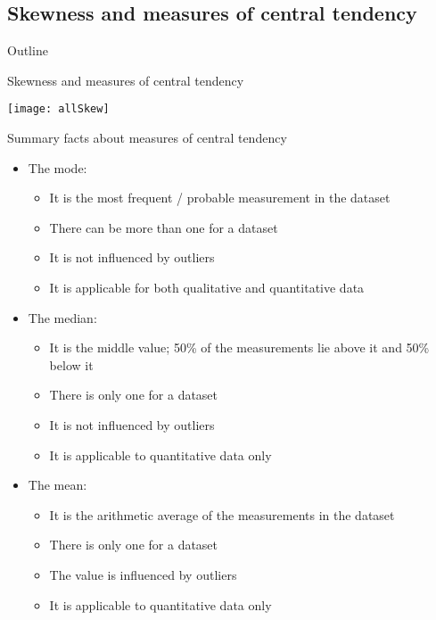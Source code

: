 \documentclass[xcolor=dvipsnames]{beamer}
\begin{document}
\subsection{Skewness and measures of central tendency}
\begin{frame}{Outline}
\tableofcontents[currentsection,subsectionstyle=show/shaded/hide]
\end{frame}

\begin{frame}{Skewness and measures of central tendency}
	\begin{center}
		\texttt{[image: allSkew]}
	\end{center}
\end{frame}

\begin{frame}{Summary facts about measures of central tendency}
	\begin{itemize}
		\item The mode:
		\begin{itemize}
			\item It is the most frequent / probable measurement in the dataset
			\item There can be more than one for a dataset
			\item It is not influenced by outliers
			\item It is applicable for both qualitative and quantitative data
		\end{itemize}\pause
		\item The median:
		\begin{itemize}
			\item It is the middle value; 50\% of the measurements lie above it and 50\% below it
			\item There is only one for a dataset
			\item It is not influenced by outliers
			\item It is applicable to quantitative data only 
		\end{itemize}\pause
		\item The mean:
		\begin{itemize}
			\item It is the arithmetic average of the measurements in the dataset
			\item There is only one for a dataset
			\item The value is influenced by outliers
			\item It is applicable to quantitative data only 
		\end{itemize}			
	\end{itemize}
\end{frame}
\end{document}
